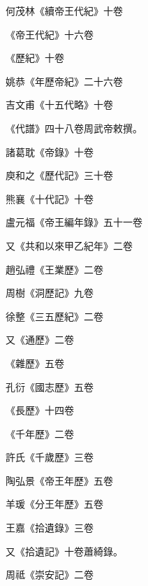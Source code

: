 \begin{pinyinscope}
 何茂林《續帝王代紀》十卷



 《帝王代紀》十六卷



 《歷紀》十卷



 姚恭《年歷帝紀》二十六卷



 吉文甫《十五代略》十卷



 《代譜》四十八卷周武帝敕撰。



 諸葛耽《帝錄》十卷



 庾和之《歷代記》三十卷



 熊襄《十代記》十卷



 盧元福《帝王編年錄》五十一卷



 又《共和以來甲乙紀年》二卷



 趙弘禮《王業歷》二卷



 周樹《洞歷記》九卷



 徐整《三五歷紀》二卷



 又《通歷》二卷



 《雜歷》五卷



 孔衍《國志歷》五卷



 《長歷》十四卷



 《千年歷》二卷



 許氏《千歲歷》三卷



 陶弘景《帝王年歷》五卷



 羊瑗《分王年歷》五卷



 王嘉《拾遺錄》三卷



 又《拾遺記》十卷蕭綺錄。



 周祗《崇安記》二卷




\end{pinyinscope}
